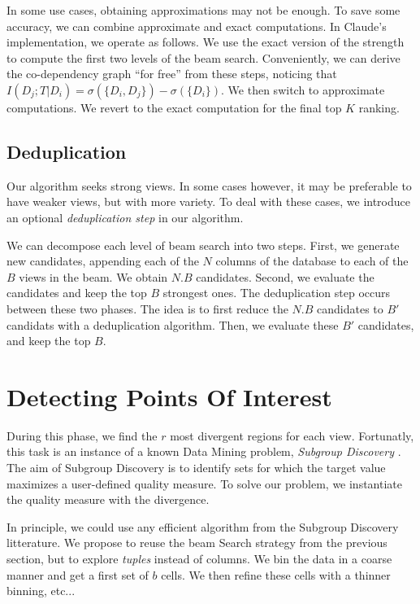 In some use cases, obtaining approximations may not be enough.  To save some
accuracy, we can combine approximate and exact computations. In Claude's
implementation, we operate as follows. We use the exact version of the strength
to compute the first two levels of the beam search. Conveniently, we can derive
the co-dependency graph ``for free'' from these steps, noticing that $I(D_j; T
| D_i) = \sigma(\{D_i, D_j\}) - \sigma(\{D_i\})$. We then switch to approximate
computations. We revert to the exact computation for the final top $K$ ranking.

\subsection{Deduplication}
\label{sec:variety}
Our algorithm seeks strong views. In some cases however, it may be preferable
to have weaker views, but with more variety. To deal with these cases, we
introduce an optional \emph{deduplication step} in our algorithm.

We can decompose each level of beam search into two steps. First, we generate
new candidates, appending each of the $N$ columns of the database to each of
the $B$ views in the beam. We obtain $N.B$ candidates. Second, we evaluate the
candidates and keep the top $B$ strongest ones. The deduplication step occurs
between these two phases. The idea is to first reduce the $N.B$ candidates to $B'$
candidats with a deduplication algorithm. Then, we evaluate these $B'$
candidates, and keep the top $B$.


\section{Detecting Points Of Interest}
\label{sec:detec}

During this phase, we find the $r$ most divergent regions for each view.
Fortunatly, this task is an instance of a known Data Mining problem,
\emph{Subgroup Discovery} \cite{klosgen1996explora}\cite{wrobel1997algorithm}.
The aim of Subgroup Discovery is to identify sets for which the target value
maximizes a user-defined quality measure. To solve our problem, we instantiate
the quality measure with the divergence.

In principle, we could use any efficient algorithm from the Subgroup Discovery
litterature.  We propose to reuse the beam Search strategy from the previous
section, but to explore \emph{tuples} instead of columns. We bin the data in a
coarse manner and get a first set of $b$ cells. We then refine these cells with
a thinner binning, etc...

